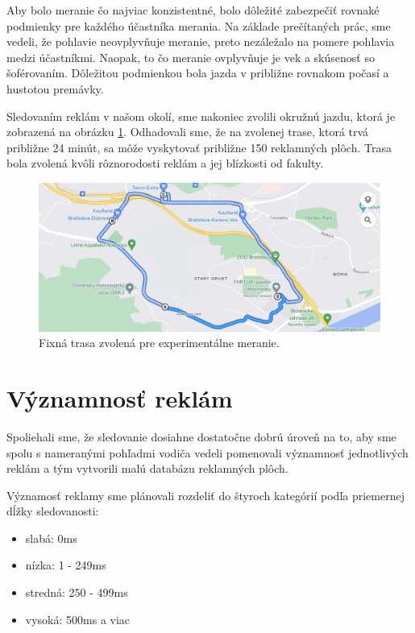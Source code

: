 
Aby bolo meranie čo najviac konzistentné, bolo dôležité zabezpečiť rovnaké podmienky pre každého účastníka merania. Na základe prečítaných prác, %
sme vedeli, že pohlavie neovplyvňuje meranie, preto nezáležalo na pomere pohlavia medzi účastníkmi. Naopak, to čo meranie ovplyvňuje je vek a skúsenosť so šoférovaním. Dôležitou podmienkou bola jazda v približne rovnakom počasí a hustotou premávky. 

Sledovaním reklám v našom okolí, sme nakoniec zvolili okružnú jazdu, ktorá je zobrazená na obrázku \ref{img:road}. Odhadovali sme, že na zvolenej trase, ktorá trvá približne 24 minút, sa môže vyskytovať približne 150 reklamných plôch. Trasa bola zvolená kvôli rôznorodosti reklám a jej blízkosti od fakulty.
\\
\begin{figure}[ht]
    \centering
    \includegraphics[width=1\textwidth]{images/03/map.png}
    \caption{Fixná trasa zvolená pre experimentálne meranie.}
    \label{img:road}
\end{figure}

\section{Významnosť reklám}

Spoliehali sme, že sledovanie dosiahne dostatočne dobrú úroveň na to, aby sme spolu s nameranými pohľadmi vodiča vedeli pomenovali významnosť jednotlivých reklám a tým vytvorili malú databázu reklamných plôch.

Významosť reklamy sme plánovali rozdeliť do štyroch kategórií podľa priemernej dĺžky sledovanosti: 

\begin{itemize}
  \item slabá: 0ms
  \item nízka: 1 - 249ms
  \item stredná: 250 - 499ms
  \item vysoká: 500ms a viac 
\end{itemize}


